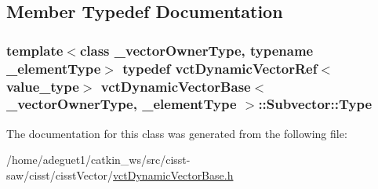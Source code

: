 \subsection{Member Typedef Documentation}
\hypertarget{classvct_dynamic_vector_base_1_1_subvector_a39712115ee3599cf1d241395f1ec645a}{
\subsubsection[{Type}]{\setlength{\rightskip}{0pt plus 5cm}template$<$class \-\_\-vector\-Owner\-Type, typename \-\_\-element\-Type$>$ typedef {\bf vct\-Dynamic\-Vector\-Ref}$<$value\-\_\-type$>$ {\bf vct\-Dynamic\-Vector\-Base}$<$ \-\_\-vector\-Owner\-Type, \-\_\-element\-Type $>$\-::{\bf Subvector\-::\-Type}}}\label{classvct_dynamic_vector_base_1_1_subvector_a39712115ee3599cf1d241395f1ec645a}


The documentation for this class was generated from the following file\-:\begin{DoxyCompactItemize}
\item 
/home/adeguet1/catkin\-\_\-ws/src/cisst-\/saw/cisst/cisst\-Vector/\hyperlink{vct_dynamic_vector_base_8h}{vct\-Dynamic\-Vector\-Base.\-h}\end{DoxyCompactItemize}
